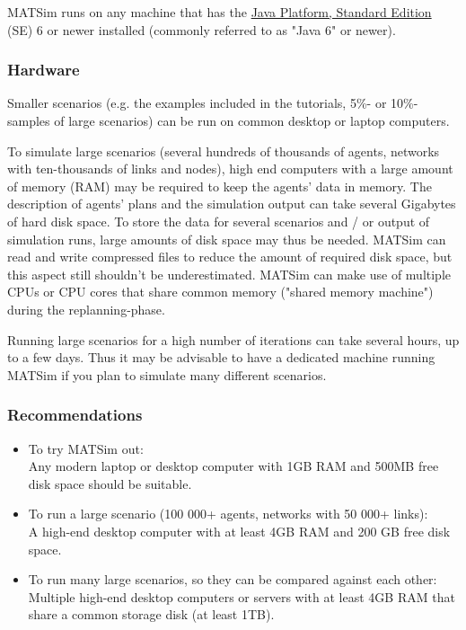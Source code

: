 \documentclass[a4paper,11pt]{report}
\begin{document}
MATSim runs on any machine that has the \href{http://java.sun.com/javase/downloads/index.jsp}{Java Platform, Standard Edition} (SE) 6 or newer installed (commonly referred to as "Java 6" or newer).

\subsubsection{Hardware}

Smaller  scenarios (e.g. the examples included in the tutorials, 5\%- or  10\%-samples of large scenarios) can be run on common desktop or laptop  computers.

To simulate large scenarios (several hundreds of  thousands of agents, networks with ten-thousands of links and nodes),  high end computers with a large amount of memory (RAM) may be required  to keep the agents' data in memory. The description of agents' plans and  the simulation output can take several Gigabytes of hard disk space. To  store the data for several scenarios and / or output of simulation  runs, large amounts of disk space may thus be needed. MATSim can read  and write compressed files to reduce the amount of required disk space,  but this aspect still shouldn't be underestimated. MATSim can make use  of multiple CPUs or CPU cores that share common memory ("shared memory  machine") during the replanning-phase.

Running large scenarios for  a high number of iterations can take several hours, up to a few days.  Thus it may be advisable to have a dedicated machine running MATSim if  you plan to simulate many different scenarios.

\subsubsection{Recommendations}
\begin{itemize}
	\item To try MATSim out:
\\Any modern laptop or desktop computer with 1GB RAM and 500MB free disk space should be suitable.
	\item To run a large scenario (100 000+ agents, networks with 50 000+ links): 
\\A high-end desktop computer with at least 4GB RAM and 200 GB free disk space.
	\item To run many large scenarios, so they can be compared against each other: 
\\Multiple high-end desktop computers or servers with at least 4GB RAM that share a common storage disk (at least 1TB).
\end{itemize}
\end{document}
